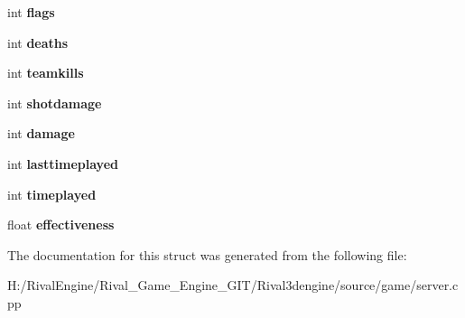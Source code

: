 \begin{DoxyCompactItemize}
int {\bfseries flags}
\item 
\mbox{\label{structserver_1_1servstate_ad80fd939d58f452b19fc083746780308}} 
int {\bfseries deaths}
\item 
\mbox{\label{structserver_1_1servstate_a7e9beed9b189e1289e44885277aa3c8c}} 
int {\bfseries teamkills}
\item 
\mbox{\label{structserver_1_1servstate_a4c36eb53575836942ce7407a86c8476b}} 
int {\bfseries shotdamage}
\item 
\mbox{\label{structserver_1_1servstate_a600b5468917c2172dfb873b415f009ee}} 
int {\bfseries damage}
\item 
\mbox{\label{structserver_1_1servstate_a4a10722c30ffbe549880080a86929890}} 
int {\bfseries lasttimeplayed}
\item 
\mbox{\label{structserver_1_1servstate_ae28339d0f8f4e55e363629a83d411a46}} 
int {\bfseries timeplayed}
\item 
\mbox{\label{structserver_1_1servstate_a7f9af2f94cb44e64f2b30035cab225e3}} 
float {\bfseries effectiveness}
\end{DoxyCompactItemize}


The documentation for this struct was generated from the following file\+:\begin{DoxyCompactItemize}
\item 
H\+:/\+Rival\+Engine/\+Rival\+\_\+\+Game\+\_\+\+Engine\+\_\+\+G\+I\+T/\+Rival3dengine/source/game/server.\+cpp\end{DoxyCompactItemize}
